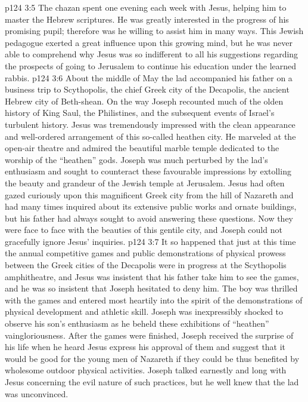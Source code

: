 \vs p124 3:5 The chazan spent one evening each week with Jesus, helping him to master the Hebrew scriptures. He was greatly interested in the progress of his promising pupil; therefore was he willing to assist him in many ways. This Jewish pedagogue exerted a great influence upon this growing mind, but he was never able to comprehend why Jesus was so indifferent to all his suggestions regarding the prospects of going to Jerusalem to continue his education under the learned rabbis.
\vs p124 3:6 \pc About the middle of May the lad accompanied his father on a business trip to Scythopolis, the chief Greek city of the Decapolis, the ancient Hebrew city of Beth\hyp{}shean. On the way Joseph recounted much of the olden history of King Saul, the Philistines, and the subsequent events of Israel’s turbulent history. Jesus was tremendously impressed with the clean appearance and well\hyp{}ordered arrangement of this so\hyp{}called heathen city. He marveled at the open\hyp{}air theatre and admired the beautiful marble temple dedicated to the worship of the “heathen” gods. Joseph was much perturbed by the lad’s enthusiasm and sought to counteract these favourable impressions by extolling the beauty and grandeur of the Jewish temple at Jerusalem. Jesus had often gazed curiously upon this magnificent Greek city from the hill of Nazareth and had many times inquired about its extensive public works and ornate buildings, but his father had always sought to avoid answering these questions. Now they were face to face with the beauties of this gentile city, and Joseph could not gracefully ignore Jesus’ inquiries.
\vs p124 3:7 It so happened that just at this time the annual competitive games and public demonstrations of physical prowess between the Greek cities of the Decapolis were in progress at the Scythopolis amphitheatre, and Jesus was insistent that his father take him to see the games, and he was so insistent that Joseph hesitated to deny him. The boy was thrilled with the games and entered most heartily into the spirit of the demonstrations of physical development and athletic skill. Joseph was inexpressibly shocked to observe his son’s enthusiasm as he beheld these exhibitions of “heathen” vaingloriousness. After the games were finished, Joseph received the surprise of his life when he heard Jesus express his approval of them and suggest that it would be good for the young men of Nazareth if they could be thus benefited by wholesome outdoor physical activities. Joseph talked earnestly and long with Jesus concerning the evil nature of such practices, but he well knew that the lad was unconvinced.
